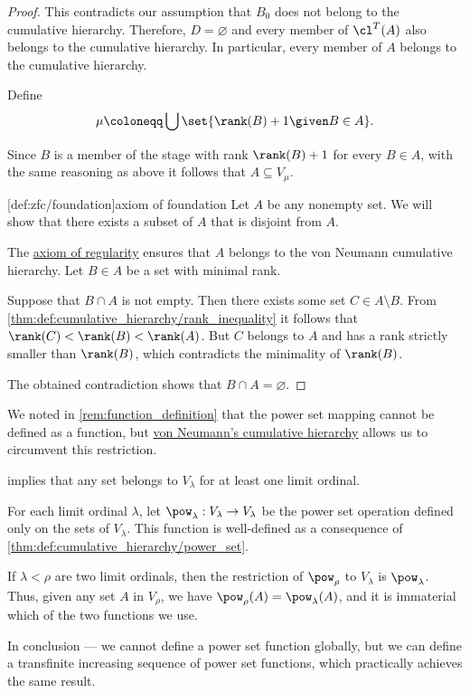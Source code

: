 \begin{proof}
  This contradicts our assumption that \( B_0 \) does not belong to the cumulative hierarchy. Therefore, \( D = \varnothing \) and every member of \( \cl^T(A) \) also belongs to the cumulative hierarchy. In particular, every member of \( A \) belongs to the cumulative hierarchy.

  Define
  \begin{equation*}
    \mu \coloneqq \bigcup\set{ \rank(B) + 1 \given B \in A }.
  \end{equation*}

  Since \( B \) is a member of the stage with rank \( \rank(B) + 1 \) for every \( B \in A \), with the same reasoning as above it follows that \( A \subseteq V_\mu \).

  [def:zfc/foundation]{axiom of foundation} Let \( A \) be any nonempty set. We will show that there exists a subset of \( A \) that is disjoint from \( A \).

  The \hyperref[thm:axiom_of_regularity]{axiom of regularity} ensures that \( A \) belongs to the von Neumann cumulative hierarchy. Let \( B \in A \) be a set with minimal rank.

  Suppose that \( B \cap A \) is not empty. Then there exists some set \( C \in A \setminus B \). From \cref{thm:def:cumulative_hierarchy/rank_inequality} it follows that \( \rank(C) < \rank(B) < \rank(A) \). But \( C \) belongs to \( A \) and has a rank strictly smaller than \( \rank(B) \), which contradicts the minimality of \( \rank(B) \).

  The obtained contradiction shows that \( B \cap A = \varnothing \).
\end{proof}

\begin{remark}\label{rem:pow_in_cumulative_hierarchy}
  We noted in \cref{rem:function_definition} that the power set mapping cannot be defined as a function, but \hyperref[def:cumulative_hierarchy]{von Neumann's cumulative hierarchy} allows us to circumvent this restriction.

   implies that any set belongs to \( V_\lambda \) for at least one limit ordinal.

  For each limit ordinal \( \lambda \), let \( \pow_\lambda: V_\lambda \to V_\lambda \) be the power set operation defined only on the sets of \( V_\lambda \). This function is well-defined as a consequence of \cref{thm:def:cumulative_hierarchy/power_set}.

  If \( \lambda < \rho \) are two limit ordinals, then the restriction of \( \pow_\rho \) to \( V_\lambda \) is \( \pow_\lambda \). Thus, given any set \( A \) in \( V_\rho \), we have \( \pow_\rho(A) = \pow_\lambda(A) \), and it is immaterial which of the two functions we use.

  In conclusion --- we cannot define a power set function globally, but we can define a transfinite increasing sequence of power set functions, which practically achieves the same result.
\end{remark}

